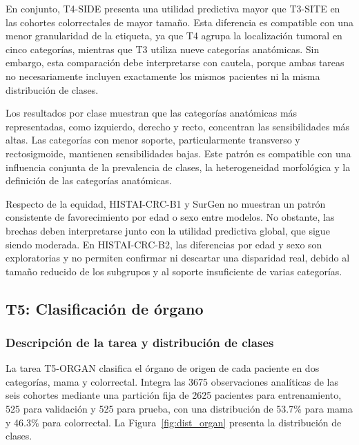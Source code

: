 En conjunto, T4-SIDE presenta una utilidad predictiva mayor que T3-SITE en las cohortes colorrectales de mayor tamaño. Esta diferencia es compatible con una menor granularidad de la etiqueta, ya que T4 agrupa la localización tumoral en cinco categorías, mientras que T3 utiliza nueve categorías anatómicas. Sin embargo, esta comparación debe interpretarse con cautela, porque ambas tareas no necesariamente incluyen exactamente los mismos pacientes ni la misma distribución de clases.

Los resultados por clase muestran que las categorías anatómicas más representadas, como izquierdo, derecho y recto, concentran las sensibilidades más altas. Las categorías con menor soporte, particularmente transverso y rectosigmoide, mantienen sensibilidades bajas. Este patrón es compatible con una influencia conjunta de la prevalencia de clases, la heterogeneidad morfológica y la definición de las categorías anatómicas.

Respecto de la equidad, HISTAI-CRC-B1 y SurGen no muestran un patrón consistente de favorecimiento por edad o sexo entre modelos. No obstante, las brechas deben interpretarse junto con la utilidad predictiva global, que sigue siendo moderada. En HISTAI-CRC-B2, las diferencias por edad y sexo son exploratorias y no permiten confirmar ni descartar una disparidad real, debido al tamaño reducido de los subgrupos y al soporte insuficiente de varias categorías.


\subsection{T5: Clasificación de órgano}
\label{sec:resultado_organ}

\subsubsection{Descripción de la tarea y distribución de clases}

La tarea T5-ORGAN clasifica el órgano de origen de cada paciente en dos categorías, mama y colorrectal. Integra las 3675 observaciones analíticas de las seis cohortes mediante una partición fija de 2625 pacientes para entrenamiento, 525 para validación y 525 para prueba, con una distribución de 53.7\% para mama y 46.3\% para colorrectal. La Figura~\ref{fig:dist_organ} presenta la distribución de clases.

